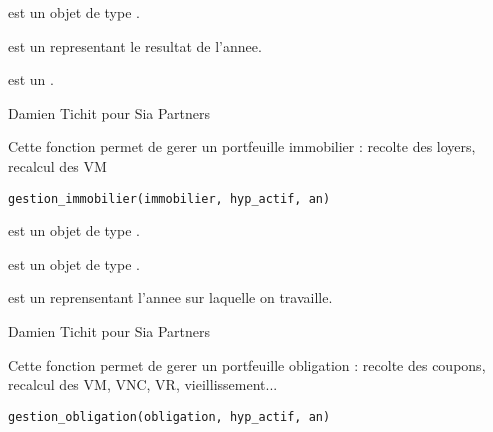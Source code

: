 \documentclass[a4paper]{book}
\begin{document}
%
\begin{Arguments}
\begin{ldescription}
\item[\code{fp}] est un objet de type .

\item[\code{resultat}] est un  representant le resultat de l'annee.

\item[\code{emprunt}] est un .
\end{ldescription}
\end{Arguments}
%
\begin{Author}\relax
Damien Tichit pour Sia Partners
\end{Author}
%
\begin{Description}\relax
Cette fonction permet de gerer un portfeuille immobilier : recolte des loyers, recalcul des VM
\end{Description}
%
\begin{Usage}
\begin{verbatim}
gestion_immobilier(immobilier, hyp_actif, an)
\end{verbatim}
\end{Usage}
%
\begin{Arguments}
\begin{ldescription}
\item[\code{immobilier}] est un objet de type .

\item[\code{hyp\_actif}] est un objet de type .

\item[\code{an}] est un  reprensentant l'annee sur laquelle on travaille.
\end{ldescription}
\end{Arguments}
%
\begin{Author}\relax
Damien Tichit pour Sia Partners
\end{Author}
%
\begin{Description}\relax
Cette fonction permet de gerer un portfeuille obligation : recolte des coupons, recalcul des VM, VNC, VR, vieillissement...
\end{Description}
%
\begin{Usage}
\begin{verbatim}
gestion_obligation(obligation, hyp_actif, an)
\end{verbatim}
\end{Usage}
\end{document}
